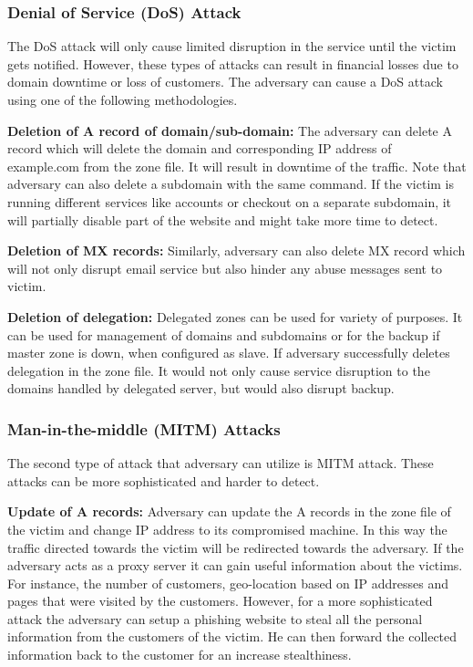 \subsubsection{Denial of Service (DoS) Attack} 
The DoS attack will only cause limited disruption in the service until the victim gets notified. However, these types of attacks can result in financial losses due to domain downtime or loss of customers. The adversary can cause a DoS attack using one of the following methodologies. 

\textbf{Deletion of A record of domain/sub-domain:} The adversary can delete A record which will delete the domain and corresponding IP address of example.com from the zone file. It will result in downtime of the traffic. Note that adversary can also delete a subdomain with the same command. If the victim is running different services like accounts or checkout on a separate subdomain, it will partially disable part of the website and might take more time to detect. 

\textbf{Deletion of MX records:} Similarly, adversary can also delete MX record which will not only disrupt email service but also hinder any abuse messages sent to victim.  



 \textbf{Deletion of delegation:} Delegated zones can be used for variety of purposes. It can be used for management of domains and subdomains or for the backup if master zone is down,  when configured as slave. If adversary successfully deletes delegation in the zone file. It would not only cause service disruption to the  domains handled by delegated server, but would also disrupt backup. 


\subsubsection{Man-in-the-middle (MITM) Attacks}
The second type of attack that adversary can utilize is MITM attack. These attacks can be more sophisticated and harder to detect. 

\textbf{Update of A records:}
Adversary can update the A records in the zone file of the victim and change IP address to its compromised machine. In this way the traffic directed towards the victim will be redirected towards the adversary. If the adversary acts as a proxy server it can gain useful information about the victims. For instance, the number of customers, geo-location based on IP addresses and pages that were visited by the customers. However, for a more sophisticated attack the adversary can setup a phishing website to steal all the personal information from the customers of the victim. He can then forward the collected information back to the customer for an increase stealthiness. 

